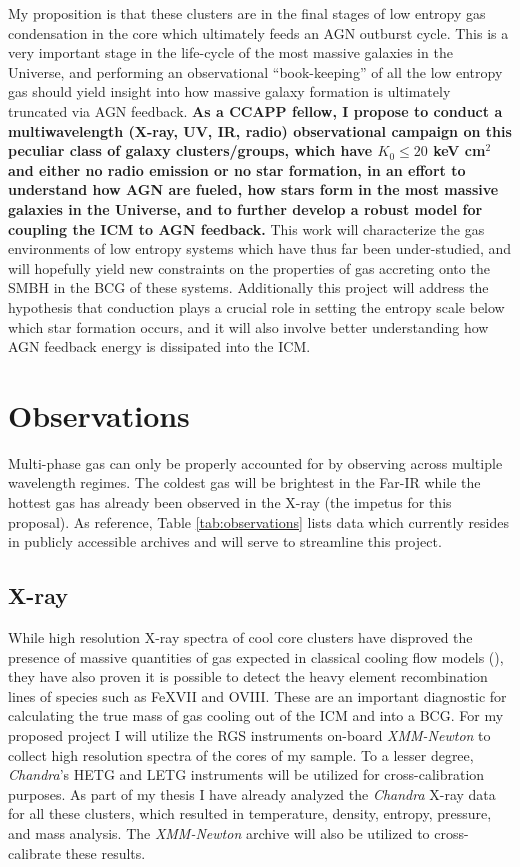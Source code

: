 \documentclass[11pt]{article}
\begin{document}
My proposition is that these clusters are in the final stages of low
entropy gas condensation in the core which ultimately feeds an AGN
outburst cycle. This is a very important stage in the
life-cycle of the most massive galaxies in the Universe, and
performing an observational ``book-keeping'' of all the low entropy gas
should yield insight into how massive galaxy formation is ultimately
truncated via AGN feedback. {\bf As a CCAPP fellow, I propose to
conduct a multiwavelength (X-ray, UV, IR, radio) observational
campaign on this peculiar class of galaxy clusters/groups, which have
$K_0 \leq 20$ keV cm$^2$ and either no radio emission or no star
formation, in an effort to understand how AGN are fueled, how stars
form in the most massive galaxies in the Universe, and to further
develop a robust model for coupling the ICM to AGN feedback.} This
work will characterize the gas environments of low entropy systems
which have thus far been under-studied, and will hopefully yield new
constraints on the properties of gas accreting onto the SMBH in the
BCG of these systems. Additionally this project will address the
hypothesis that conduction plays a crucial role in setting the entropy
scale below which star formation occurs, and it will also involve
better understanding how AGN feedback energy is dissipated into the
ICM.


\section{Observations}
Multi-phase gas can only be properly accounted for by observing across
multiple wavelength regimes. The coldest gas will be brightest in the
Far-IR while the hottest gas has already been observed in the X-ray
(the impetus for this proposal). As reference, Table
\ref{tab:observations} lists data which currently resides in publicly
accessible archives and will serve to streamline this project.

\subsection{X-ray}
While high resolution X-ray spectra of cool core clusters have
disproved the presence of massive quantities of gas expected in
classical cooling flow models (\cite{2006PhR...427....1P}), they have
also proven it is possible to detect the heavy element recombination lines
of species such as FeXVII and OVIII. These are an important
diagnostic for calculating the true mass of gas cooling out of the ICM
and into a BCG. For my proposed project I will utilize the RGS
instruments on-board {\it XMM-Newton} to collect high resolution
spectra of the cores of my sample. To a lesser degree, {\it Chandra}'s
HETG and LETG instruments will be utilized for cross-calibration
purposes. As part of my thesis I have already analyzed the {\it
Chandra} X-ray data for all these clusters, which resulted in
temperature, density, entropy, pressure, and mass analysis. The {\it
XMM-Newton} archive will also be utilized to cross-calibrate these
results.
\end{document}
